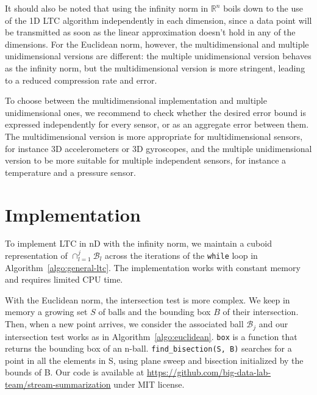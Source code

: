 \documentclass[10pt, conference, compsocconf]{IEEEtran}
\begin{document}
It should also be noted that using the infinity norm in $\mathbb{R}^n$ 
boils down to the use of the 1D LTC algorithm independently in each 
dimension, since a data point will be transmitted as soon as the linear 
approximation doesn't hold in any of the dimensions. For the Euclidean 
norm, however, the multidimensional and multiple unidimensional 
versions are different: the multiple unidimensional version 
behaves as the infinity norm, but the multidimensional version is more 
stringent, leading to a reduced compression rate and error.

To choose between the multidimensional implementation and multiple 
unidimensional ones, we recommend to check whether the desired 
error bound is expressed independently for every sensor, or as an aggregate error between them.
The multidimensional version is
more appropriate for multidimensional sensors, for instance 3D 
accelerometers or 3D gyroscopes, and the multiple unidimensional 
version to be more suitable for multiple independent sensors, for 
instance a temperature and a pressure sensor.

\section{Implementation}
\label{sec:implementation}

To implement LTC in nD with the infinity norm, we maintain a cuboid 
representation of $\cap_{l=1}^j{\mathcal{B}_l}$ across the 
iterations of the \texttt{while} loop in 
Algorithm~\ref{algo:general-ltc}. The implementation works with
constant memory and requires limited CPU time.

With the Euclidean norm, the intersection test is more complex. We keep 
in memory a growing set $S$ of balls and the bounding box $B$ of their 
intersection. Then, when a new point arrives, we consider the 
associated ball $\mathcal{B}_j$ and our intersection test works as in 
Algorithm~\ref{algo:euclidean}. \texttt{box} is a function that returns 
the bounding box of an n-ball. \texttt{find\_bisection(S, B)} searches 
for a point in all the elements in S, using plane sweep and bisection 
initialized by the bounds of B. Our code is available at 
\url{https://github.com/big-data-lab-team/stream-summarization} under 
MIT license.
\end{document}
